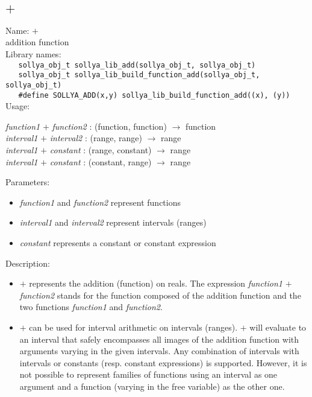 \subsection{$+$}
\label{labplus}
\noindent Name: \textbf{$+$}\\
\phantom{aaa}addition function\\[0.2cm]
\noindent Library names:\\
\verb|   sollya_obj_t sollya_lib_add(sollya_obj_t, sollya_obj_t)|\\
\verb|   sollya_obj_t sollya_lib_build_function_add(sollya_obj_t, sollya_obj_t)|\\
\verb|   #define SOLLYA_ADD(x,y) sollya_lib_build_function_add((x), (y))|\\[0.2cm]
\noindent Usage: 
\begin{center}
\emph{function1} \textbf{$+$} \emph{function2} : (\textsf{function}, \textsf{function}) $\rightarrow$ \textsf{function}\\
\emph{interval1} \textbf{$+$} \emph{interval2} : (\textsf{range}, \textsf{range}) $\rightarrow$ \textsf{range}\\
\emph{interval1} \textbf{$+$} \emph{constant} : (\textsf{range}, \textsf{constant}) $\rightarrow$ \textsf{range}\\
\emph{interval1} \textbf{$+$} \emph{constant} : (\textsf{constant}, \textsf{range}) $\rightarrow$ \textsf{range}\\
\end{center}
Parameters: 
\begin{itemize}
\item \emph{function1} and \emph{function2} represent functions
\item \emph{interval1} and \emph{interval2} represent intervals (ranges)
\item \emph{constant} represents a constant or constant expression
\end{itemize}
\noindent Description: \begin{itemize}

\item \textbf{$+$} represents the addition (function) on reals. 
   The expression \emph{function1} \textbf{$+$} \emph{function2} stands for
   the function composed of the addition function and the two
   functions \emph{function1} and \emph{function2}.

\item \textbf{$+$} can be used for interval arithmetic on intervals
   (ranges). \textbf{$+$} will evaluate to an interval that safely
   encompasses all images of the addition function with arguments varying
   in the given intervals.  Any combination of intervals with intervals
   or constants (resp. constant expressions) is supported. However, it is
   not possible to represent families of functions using an interval as
   one argument and a function (varying in the free variable) as the
   other one.
\end{itemize}
